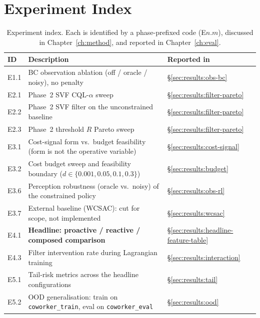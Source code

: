 \documentclass[11pt,a4paper]{report}
\begin{document}
\section{Experiment Index}
\label{sec:setup:exp-index}

\begin{table}[h]
\centering
\caption{Experiment index. Each is identified by a phase-prefixed
code (E$n.m$), discussed in Chapter~\ref{ch:method}, and reported in
Chapter~\ref{ch:eval}.}
\label{tab:experiment-index}
\small
\begin{tabular}{lll}
\toprule
ID & Description & Reported in \\
\midrule
E1.1   & BC observation ablation (off / oracle / noisy), no penalty
       & \S\ref{sec:results:obs-bc} \\
E2.1   & Phase~2 SVF CQL-$\alpha$ sweep
       & \S\ref{sec:results:filter-pareto} \\
E2.2   & Phase~2 SVF filter on the unconstrained baseline
       & \S\ref{sec:results:filter-pareto} \\
E2.3   & Phase~2 threshold $R$ Pareto sweep
       & \S\ref{sec:results:filter-pareto} \\
E3.1   & Cost-signal form vs.\ budget feasibility (form is not the operative variable)
       & \S\ref{sec:results:cost-signal} \\
E3.2   & Cost budget sweep and feasibility boundary ($d \in \{0.001, 0.05, 0.1, 0.3\}$)
       & \S\ref{sec:results:budget} \\
E3.6   & Perception robustness (oracle vs.\ noisy) of the constrained policy
       & \S\ref{sec:results:obs-rl} \\
E3.7   & External baseline (WCSAC): cut for scope, not implemented
       & \S\ref{sec:results:wcsac} \\
E4.1   & \textbf{Headline: proactive / reactive / composed comparison}
       & \S\ref{sec:results:headline-feature-table} \\
E4.3   & Filter intervention rate during Lagrangian training
       & \S\ref{sec:results:interaction} \\
E5.1   & Tail-risk metrics across the headline configurations
       & \S\ref{sec:results:tail} \\
E5.2   & OOD generalisation: train on \texttt{coworker\_train}, eval on \texttt{coworker\_eval}
       & \S\ref{sec:results:ood} \\
\bottomrule
\end{tabular}
\end{table}
\end{document}
